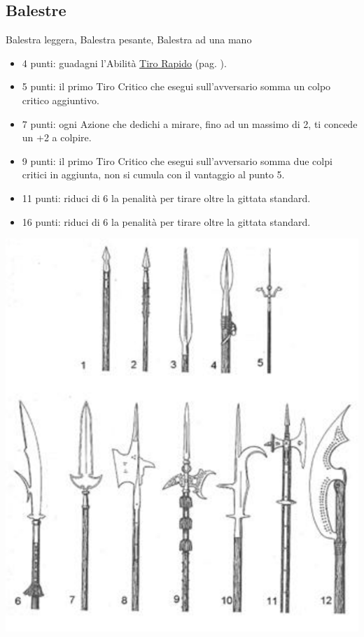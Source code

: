 \begin{multicols}{2}
\begin{itemize}[leftmargin=*]
\end{itemize}

\subsection{Balestre}Balestra leggera, Balestra pesante, Balestra ad una mano\label{listaarmibalestr}

\begin{itemize}[leftmargin=*] \setlength{\itemsep}{0pt}

\item 4 punti: guadagni l'Abilità \hyperlink{Tiro Rapido}{Tiro Rapido} (pag. \pageref{Tiro Rapido}).
\item 5 punti: il primo Tiro Critico che esegui sull'avversario somma un colpo critico aggiuntivo.
\item 7 punti: ogni Azione che dedichi a mirare, fino ad un massimo di 2, ti concede un +2 a colpire.
\item 9 punti: il primo Tiro Critico che esegui sull'avversario somma due colpi critici in aggiunta, non si cumula con il vantaggio al punto 5.
\item 11 punti: riduci di 6 la penalità per tirare oltre la gittata standard.
\item 16 punti: riduci di 6 la penalità per tirare oltre la gittata standard.

\end{itemize}


\begin{center}
	\includegraphics[width=0.7\linewidth]{immagini/arma-asta.png}


\end{center}
\end{multicols}
